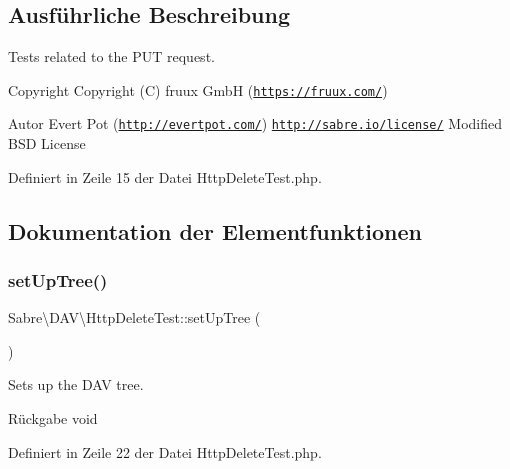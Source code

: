 \subsection{Ausführliche Beschreibung}
Tests related to the P\+UT request.

\begin{DoxyCopyright}{Copyright}
Copyright (C) fruux GmbH (\href{https://fruux.com/}{\tt https\+://fruux.\+com/}) 
\end{DoxyCopyright}
\begin{DoxyAuthor}{Autor}
Evert Pot (\href{http://evertpot.com/}{\tt http\+://evertpot.\+com/})  \href{http://sabre.io/license/}{\tt http\+://sabre.\+io/license/} Modified B\+SD License 
\end{DoxyAuthor}


Definiert in Zeile 15 der Datei Http\+Delete\+Test.\+php.



\subsection{Dokumentation der Elementfunktionen}
\mbox{\label{class_sabre_1_1_d_a_v_1_1_http_delete_test_ab9e9231c1ce3ba075bc6d374afd7d1e0}} 
\subsubsection{\texorpdfstring{set\+Up\+Tree()}{setUpTree()}}
{\footnotesize\ttfamily Sabre\textbackslash{}\+D\+A\+V\textbackslash{}\+Http\+Delete\+Test\+::set\+Up\+Tree (\begin{DoxyParamCaption}{ }\end{DoxyParamCaption})}

Sets up the D\+AV tree.

\begin{DoxyReturn}{Rückgabe}
void 
\end{DoxyReturn}


Definiert in Zeile 22 der Datei Http\+Delete\+Test.\+php.

\mbox{\label{class_sabre_1_1_d_a_v_1_1_http_delete_test_aac9e47df83886ec291a2a2421d92ca15}} 
